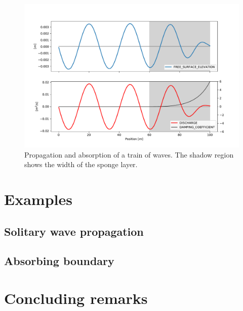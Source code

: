\begin{figure}
    \centering
    \includegraphics[width=.8\textwidth]{img/absorbing_boundary/absorbing_boundary.pdf}
    \caption{Propagation and absorption of a train of waves. The shadow region shows the width of the sponge layer.}
    \label{absorbing_boundary}
\end{figure}


\section{Examples}


\subsection{Solitary wave propagation}


\subsection{Absorbing boundary}



\section{Concluding remarks}


